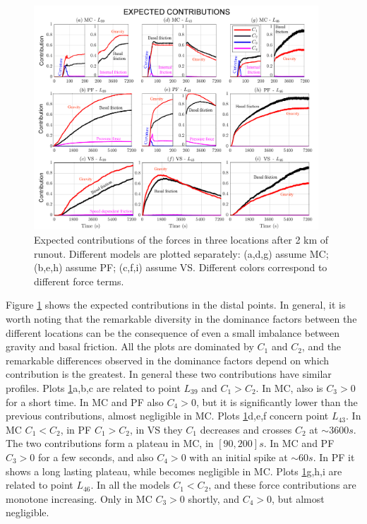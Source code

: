 \documentclass{article}
\begin{document}
\begin{figure}[H]
         \centering
        \includegraphics[width=0.95\textwidth]{figures/Colima/Ci2_total.png}
        \caption{Expected contributions of the forces in three locations after 2 km of runout. Different models are plotted separately: (a,d,g) assume MC; (b,e,h) assume PF; (c,f,i) assume VS. Different colors correspond to different force terms.}
        \label{fig:Colima-Ci_2}
\end{figure}
Figure \ref{fig:Colima-Ci_2} shows the expected contributions in the distal points. In general, it is worth noting that the remarkable diversity in the dominance factors between the different locations can be the consequence of even a small imbalance between gravity and basal friction. All the plots are dominated by $C_1$ and $C_2$, and the remarkable differences observed in the dominance factors depend on which contribution is the greatest. In general these two contributions have similar profiles. Plots \ref{fig:Colima-Ci_2}a,b,c are related to point $L_{39}$ and $C_1>C_2$. In MC, also is $C_3>0$ for a short time. In MC and PF also $C_4>0$, but it is significantly lower than the previous contributions, almost negligible in MC. Plots \ref{fig:Colima-Ci_2}d,e,f concern point $L_{43}$. In MC $C_1<C_2$, in PF $C_1>C_2$, in VS they $C_1$ decreases and crosses $C_2$ at $\sim 3600 s$. The two contributions form a plateau in MC, in $[90, 200] s$. In MC and PF $C_3>0$ for a few seconds, and also $C_4>0$ with an initial spike at $\sim 60s$. In PF it shows a long lasting plateau, while becomes negligible in MC. Plots \ref{fig:Colima-Ci_2}g,h,i are related to point $L_{46}$. In all the models $C_1<C_2$, and these force contributions are monotone increasing. Only in MC $C_3>0$ shortly, and $C_4>0$, but almost negligible.
\end{document}
